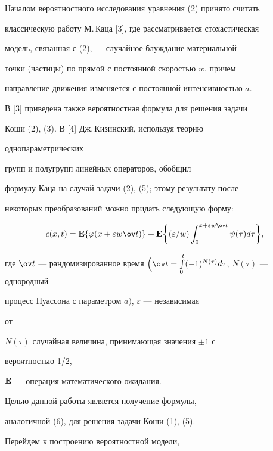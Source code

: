 Началом вероятностного исследования уравнения (2) принято считать 


классическую работу М.\,Каца [3], где рассматривается стохастическая 


модель, связанная с (2), --- случайное блуждание материальной 


точки (частицы) по прямой с постоянной скоростью $w$, причем 


направление движения изменяется с постоянной интенсивностью $a$. 


В [3] приведена также вероятностная формула для решения задачи 


Коши (2), (3). В [4] Дж.\,Кизинский, используя теорию 


однопараметрических 


групп и полугрупп линейных операторов, обобщил 


формулу Каца на случай задачи (2), (5); этому результату после 


некоторых преобразований можно придать следующую форму: 


\begin{equation} 


c(x,t)=\bold E\{\varphi(x+\varepsilon w\ov t)\}+ 


\bold E\bigg\{(\varepsilon/w) 


\int^{x+\varepsilon w\ov t}_0\psi(\tau)d\tau\bigg\}, 


\end{equation} 


где $\ov t$ --- рандомизированное время $\Big(\ov 


t=\int\limits^t_0(-1)^{N(\tau)}d\tau$, $N(\tau)$ --- однородный 


процесс Пуассона с параметром $a\Big)$, $\varepsilon$ --- независимая 


от 


$N(\tau)$ случайная величина, принимающая значения $\pm1$ с 


вероятностью 1/2, 


$\bold E$ --- операция математического ожидания. 


 


Целью данной работы является получение формулы, 


аналогичной (6), для решения задачи Коши (1), (5). 


 


Перейдем к построению вероятностной модели, 



